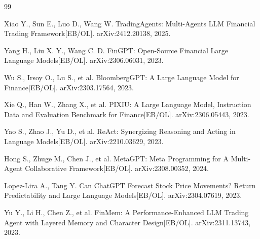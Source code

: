 \documentclass[UTF8,a4paper,12pt]{ctexart}
\begin{document}
\newpage
\begin{thebibliography}{99}

Xiao Y., Sun E., Luo D., Wang W. TradingAgents: Multi-Agents LLM Financial Trading Framework[EB/OL]. arXiv:2412.20138, 2025.

Yang H., Liu X. Y., Wang C. D. FinGPT: Open-Source Financial Large Language Models[EB/OL]. arXiv:2306.06031, 2023.

Wu S., Irsoy O., Lu S., et al. BloombergGPT: A Large Language Model for Finance[EB/OL]. arXiv:2303.17564, 2023.

Xie Q., Han W., Zhang X., et al. PIXIU: A Large Language Model, Instruction Data and Evaluation Benchmark for Finance[EB/OL]. arXiv:2306.05443, 2023.

Yao S., Zhao J., Yu D., et al. ReAct: Synergizing Reasoning and Acting in Language Models[EB/OL]. arXiv:2210.03629, 2023.

Hong S., Zhuge M., Chen J., et al. MetaGPT: Meta Programming for A Multi-Agent Collaborative Framework[EB/OL]. arXiv:2308.00352, 2024.

Lopez-Lira A., Tang Y. Can ChatGPT Forecast Stock Price Movements? Return Predictability and Large Language Models[EB/OL]. arXiv:2304.07619, 2023.

Yu Y., Li H., Chen Z., et al. FinMem: A Performance-Enhanced LLM Trading Agent with Layered Memory and Character Design[EB/OL]. arXiv:2311.13743, 2023.



\end{thebibliography}
\end{document}
